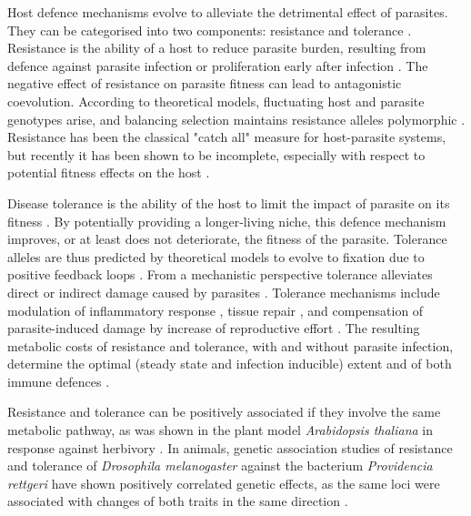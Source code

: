 \documentclass[12pt]{article}
\begin{document}
Host defence mechanisms evolve to alleviate the detrimental effect of parasites. They can be categorised into two components: resistance and tolerance \citep{raaberg_decomposing_2009}. Resistance is the ability of a host to reduce parasite burden, resulting from defence against parasite infection or proliferation early after infection \citep{schmid-hempel_evolutionary_2013}. The negative effect of resistance on parasite fitness can lead to antagonistic coevolution. According to theoretical models, fluctuating host and parasite genotypes arise, and balancing selection maintains resistance alleles polymorphic \citep{Boots2008, roy_evolutionary_2000}. Resistance has been the classical "catch all" measure for host-parasite systems, but recently it has been shown to be incomplete, especially with respect to potential fitness effects on the host \citep{kutzer_maximising_2016, raaberg_decomposing_2009}.\par

Disease tolerance \parencite[not to be confused from "immunological tolerance", unresponsiveness to self antigens;][]{medzhitov_disease_2012} is the ability of the host to limit the impact of parasite on its fitness \citep{raaberg_decomposing_2009, Vale2012, kutzer_maximising_2016}. By potentially providing a longer-living niche, this defence mechanism improves, or at least does not deteriorate, the fitness of the parasite. Tolerance alleles are thus predicted by theoretical models to evolve to fixation due to positive feedback loops \citep{Boots2008, restif_concurrent_2004, roy_evolutionary_2000}. From a mechanistic perspective tolerance alleviates direct or indirect damage \parencite[e.g. excessive immune response underlying resistance against parasites, called immunopathology;][]{graham_evolutionary_2005} caused by parasites \citep{raaberg_decomposing_2009}. Tolerance mechanisms include modulation of inflammatory response \citep{Ayres2012}, tissue repair \parencite[stress response, damage repair and cellular regeneration mechanisms;][]{soares_disease_2017}, and compensation of parasite-induced damage by increase of reproductive effort \citep{Baucom2011}. The resulting metabolic costs of resistance and tolerance, with and without parasite infection, determine the optimal (steady state and infection inducible) extent and of both immune defences \citep{sheldon_ecological_1996}.\par

Resistance and tolerance can be positively associated if they involve the same metabolic pathway, as was shown in the plant model \textit{Arabidopsis thaliana} in response against herbivory \citep{mesa_molecular_2017}. In animals, genetic association studies of resistance and tolerance of \textit{Drosophila melanogaster} against the bacterium \textit{Providencia rettgeri} have shown positively correlated genetic effects, as the same loci were associated with changes of both traits in the same direction \citep{howick_genetic_2017}.\par
\end{document}
